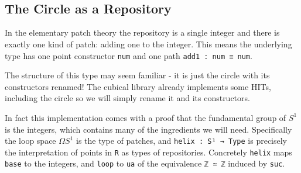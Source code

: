 \begin{code}[hide]
%
\>[2]\AgdaSymbol{;}\AgdaSpace{}%
\<%
\\
%
\>[2]\AgdaSymbol{;}\AgdaSpace{}%
\<%
\\
%
\>[2]\AgdaSymbol{;}\AgdaSpace{}%
\<%
\\
%
\>[2]\AgdaSymbol{;}\AgdaSpace{}%
\<%
\\
%
\>[2]\AgdaSymbol{)}\<%
\\
%
\\[\AgdaEmptyExtraSkip]%
\>[0]\AgdaSpace{}%
\AgdaSpace{}%
\<%
\\
\>[0][@{}l@{\AgdaIndent{0}}]%
\>[2]\AgdaSpace{}%
\AgdaSymbol{(}\AgdaSymbol{)}\<%
\end{code}

\subsection{The Circle as a Repository}

In the elementary patch theory the repository is a single integer and there is exactly one kind of patch:
adding one to the integer. This means the underlying type has one point constructor \texttt{num} and
one path \texttt{add1 : num ≡ num}.

The structure of this type may seem familiar - it is just the circle with its constructors renamed!
The cubical library already implements some HITs, including the circle so we will simply rename it and
its constructors.

In fact this implementation comes with a proof that the fundamental group of $S^1$ is the integers,
which contains many of the ingredients we will need. Specifically the loop space $ΩS^1$ is the type
of patches, and \texttt{helix : S¹ → Type} is precisely the interpretation of points in \texttt{R} as
types of repositories. Concretely \texttt{helix} maps \texttt{base} to the integers, and \texttt{loop}
to \texttt{ua} of the equivalence \texttt{ℤ ≃ ℤ} induced by \texttt{suc}.

